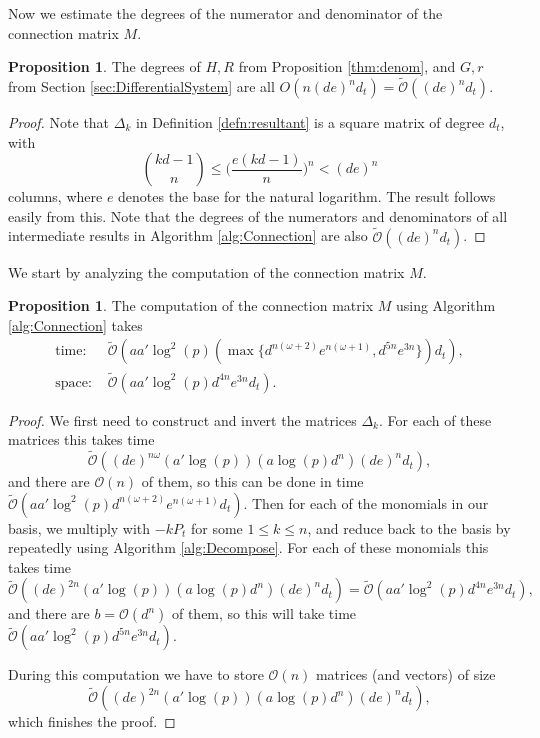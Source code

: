 \documentclass[a4paper,11pt]{article}
\numberwithin{equation}{section}
\theoremstyle{definition}
\newtheorem{prop}[thm]{Proposition}
\begin{document}
Now we estimate the degrees of the numerator and denominator of the
connection matrix $M$. 

\begin{prop}
The degrees of $H,R$ from Proposition \ref{thm:denom}, and
$G,r$ from Section \ref{sec:DifferentialSystem} are all
$O(n(de)^n d_t)=\tilde{\mathcal{O}}((de)^n d_t)$.
\end{prop}

\begin{proof}
Note that $\Delta_k$ in Definition \ref{defn:resultant} is a square matrix of degree $d_t$, 
with
\[
{kd-1 \choose n} \leq \bigl( \frac{e(kd-1)}{n} \bigr)^n < (de)^n
\]
columns, where $e$ denotes the base for the natural logarithm. The result follows easily
from this. Note that the degrees of the numerators and denominators of all intermediate 
results in Algorithm \ref{alg:Connection} are also $\tilde{\mathcal{O}}((de)^n d_t)$.
\end{proof}

We start by analyzing the computation of the connection matrix $M$.
\begin{prop}
The computation of the connection matrix $M$ using Algorithm \ref{alg:Connection} takes
\begin{align*}
\mbox{time: }  &\tilde{\mathcal{O}}(a a' \log^2(p) (\max \{ d^{n(\omega+2)} e^{n(\omega+1)}, d^{5n}e^{3n} \}) d_t), \\
\mbox{space: } &\tilde{\mathcal{O}}(a a' \log^2(p) d^{4n}e^{3n} d_t).
\end{align*}
\end{prop}

\begin{proof}
We first need to construct and invert the matrices $\Delta_k$. For each of these matrices this takes time
\[
\tilde{\mathcal{O}}((de)^{n \omega} (a' \log(p)) (a \log(p) d^n) (de)^n d_t),
\] 
and there are $\mathcal{O}(n)$ of them, so this can be done in time 
$\tilde{\mathcal{O}}(a a' \log^2(p) d^{n(\omega+2)} e^{n(\omega+1)} d_t)$.
Then for each of the monomials in our basis, we  multiply with $-k P_t$ for some 
$1 \leq k \leq n$, and reduce back to the basis by repeatedly using 
Algorithm \ref{alg:Decompose}. For each of these monomials this takes time 
\[
\tilde{\mathcal{O}}((de)^{2n} (a' \log(p)) (a \log(p) d^n) (de)^n d_t)=\tilde{\mathcal{O}}(a a' \log^2(p) d^{4n}e^{3n} d_t),
\]
and there are $b=\mathcal{O}(d^n)$ of them, so this will take
time $\tilde{\mathcal{O}}(a a' \log^2(p) d^{5n}e^{3n}d_t)$. 

During this computation we have to store $\mathcal{O}(n)$ matrices (and vectors) of size 
\[
\tilde{\mathcal{O}}((de)^{2n} (a' \log(p)) (a \log(p) d^n) (de)^n d_t),
\] 
which finishes the proof.
\end{proof}
\end{document}
